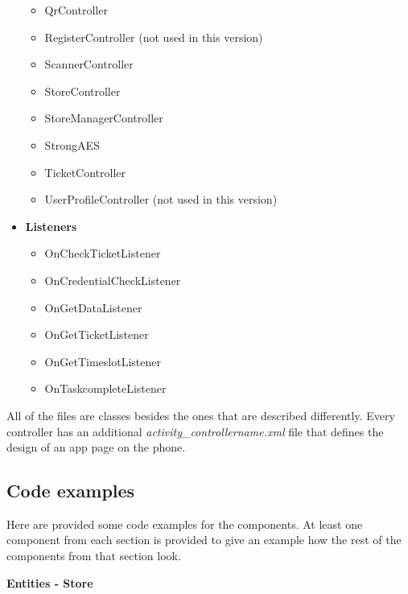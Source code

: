 \begin{itemize}
\begin{itemize}
\item QrController
\item RegisterController (not used in this version)
\item ScannerController
\item StoreController
\item StoreManagerController
\item StrongAES
\item TicketController
\item UserProfileController (not used in this version)
\end{itemize}
\item \textbf{Listeners}
\begin{itemize}
\item OnCheckTicketListener
\item OnCredentialCheckListener
\item OnGetDataListener
\item OnGetTicketListener
\item OnGetTimeslotListener
\item OnTaskcompleteListener
\end{itemize}
\end{itemize}

All of the files are classes besides the ones that are described differently. Every controller has an additional \textit{activity\_controllername.xml} file that defines the design of an app page on the phone.
\subsection{Code examples}
\hspace{\parindent} Here are provided some code examples for the components. At least one component from each section is provided to give an example how the rest of the components from that section look.\newline

\textbf{Entities - Store}

